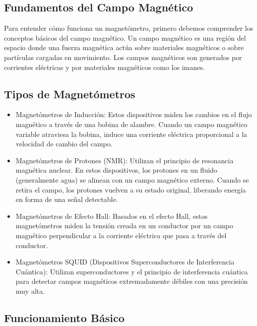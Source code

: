 \subsection{Fundamentos del Campo Magnético}

Para entender cómo funciona un magnetómetro, primero debemos comprender los conceptos básicos del campo magnético. Un campo magnético es una región del espacio donde una fuerza magnética actúa sobre materiales magnéticos o sobre partículas cargadas en movimiento. Los campos magnéticos son generados por corrientes eléctricas y por materiales magnéticos como los imanes.

\subsection{Tipos de Magnetómetros}

\begin{itemize}
    \item Magnetómetros de Inducción: Estos dispositivos miden los cambios en el flujo magnético a través de una bobina de alambre. Cuando un campo magnético variable atraviesa la bobina, induce una corriente eléctrica proporcional a la velocidad de cambio del campo.
    
    \item Magnetómetros de Protones (NMR): Utilizan el principio de resonancia magnética nuclear. En estos dispositivos, los protones en un fluido (generalmente agua) se alinean con un campo magnético externo. Cuando se retira el campo, los protones vuelven a su estado original, liberando energía en forma de una señal detectable.
    
    \item Magnetómetros de Efecto Hall: Basados en el efecto Hall, estos magnetómetros miden la tensión creada en un conductor por un campo magnético perpendicular a la corriente eléctrica que pasa a través del conductor.
    
    \item Magnetómetros SQUID (Dispositivos Superconductores de Interferencia Cuántica): Utilizan superconductores y el principio de interferencia cuántica para detectar campos magnéticos extremadamente débiles con una precisión muy alta.
    
\end{itemize}

\subsection{Funcionamiento Básico}

